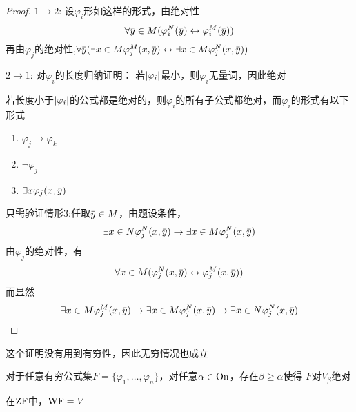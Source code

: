 \documentclass[11pt]{article}
\begin{document}
\begin{proof}
\(1\to 2\): 设\(\varphi_i\)形如这样的形式，由绝对性
\begin{equation*}
\forall\bary\in M(\varphi_i^N(\bary)\leftrightarrow\varphi_i^M(\bary))
\end{equation*}
再由\(\varphi_j\)的绝对性,\(\forall\bary(\exists x\in M\varphi_j^M(x,\bary)\leftrightarrow\exists x\in M\varphi_j^N(x,\bary))\)

\(2\to 1\): 对\(\varphi_i\)的长度归纳证明：
若\(\abs{\varphi_i}\)最小，则\(\varphi_i\)无量词，因此绝对

若长度小于\(\abs{\varphi_i}\)的公式都是绝对的，则\(\varphi_i\)的所有子公式都绝对，而\(\varphi_i\)的形式有以下形式
\begin{enumerate}
\item \(\varphi_j\to\varphi_k\)
\item \(\neg\varphi_j\)
\item \(\exists x\varphi_j(x,\bary)\)
\end{enumerate}


只需验证情形3:任取\(\bary\in M\)，由题设条件，
\begin{equation*}
\exists x\in N\varphi_j^N(x,\bary)\to\exists x\in M\varphi_j^N(x,\bary)
\end{equation*}
由\(\varphi_j\)的绝对性，有
\begin{equation*}
\forall x\in M(\varphi_j^N(x,\bary)\leftrightarrow\varphi_j^M(x,\bary))
\end{equation*}
而显然
\begin{equation*}
\exists x\in M\varphi_j^M(x,\bary)\to\exists x\in M\varphi_j^N(x,\bary)\to\exists x\in N\varphi_j^N(x,\bary)
\end{equation*}
\end{proof}

这个证明没有用到有穷性，因此无穷情况也成立

\begin{theorem}[反映定理，ZF]
对于任意有穷公式集\(F=\{\varphi_1,\dots,\varphi_n\}\)，对任意\(\alpha\in\operatorname{On}\)，存在\(\beta\ge\alpha\)使得
\(F\)对\(V_\beta\)绝对
\end{theorem}

在\(\operatorname{ZF}\)中，\(\operatorname{WF}=V\)
\end{document}
